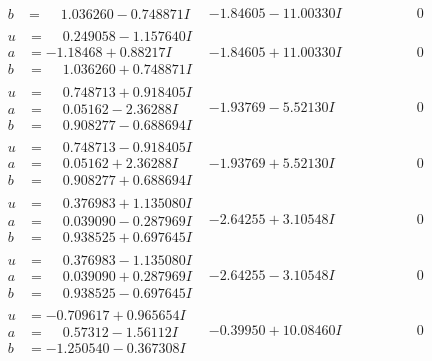 \documentclass[1p]{elsarticle_modified}
\theoremstyle{definition}
\begin{document}
$$\begin{array}{c|c|c}
\begin{aligned}
b &= \phantom{-}1.036260 - 0.748871 I\end{aligned}
 & -1.84605 - 11.00330 I & \phantom{-0.000000 } 0 \\ \hline\begin{aligned}
u &= \phantom{-}0.249058 - 1.157640 I \\
a &= -1.18468 + 0.88217 I \\
b &= \phantom{-}1.036260 + 0.748871 I\end{aligned}
 & -1.84605 + 11.00330 I & \phantom{-0.000000 } 0 \\ \hline\begin{aligned}
u &= \phantom{-}0.748713 + 0.918405 I \\
a &= \phantom{-}0.05162 - 2.36288 I \\
b &= \phantom{-}0.908277 - 0.688694 I\end{aligned}
 & -1.93769 - 5.52130 I & \phantom{-0.000000 } 0 \\ \hline\begin{aligned}
u &= \phantom{-}0.748713 - 0.918405 I \\
a &= \phantom{-}0.05162 + 2.36288 I \\
b &= \phantom{-}0.908277 + 0.688694 I\end{aligned}
 & -1.93769 + 5.52130 I & \phantom{-0.000000 } 0 \\ \hline\begin{aligned}
u &= \phantom{-}0.376983 + 1.135080 I \\
a &= \phantom{-}0.039090 - 0.287969 I \\
b &= \phantom{-}0.938525 + 0.697645 I\end{aligned}
 & -2.64255 + 3.10548 I & \phantom{-0.000000 } 0 \\ \hline\begin{aligned}
u &= \phantom{-}0.376983 - 1.135080 I \\
a &= \phantom{-}0.039090 + 0.287969 I \\
b &= \phantom{-}0.938525 - 0.697645 I\end{aligned}
 & -2.64255 - 3.10548 I & \phantom{-0.000000 } 0 \\ \hline\begin{aligned}
u &= -0.709617 + 0.965654 I \\
a &= \phantom{-}0.57312 - 1.56112 I \\
b &= -1.250540 - 0.367308 I\end{aligned}
 & -0.39950 + 10.08460 I & \phantom{-0.000000 } 0 \\ \hline\begin{aligned}

\end{aligned}
\end{array}$$
\end{document}

